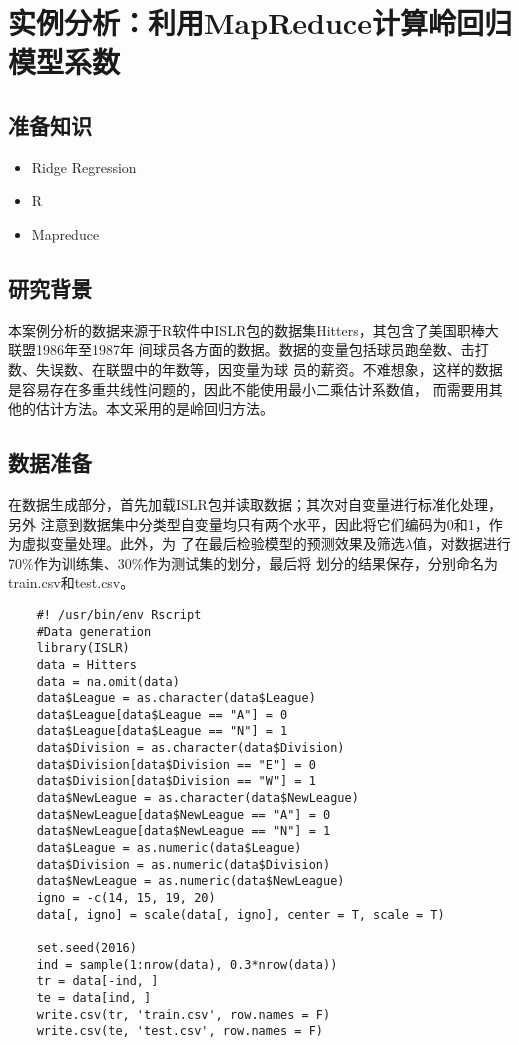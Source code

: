 \section{实例分析：利用MapReduce计算岭回归模型系数}\label{ux5b9eux4f8bux5206ux6790ux5229ux7528mapreduceux8ba1ux7b97ux5cadux56deux5f52ux6a21ux578bux7cfbux6570}

\subsection{准备知识}\label{ux51c6ux5907ux77e5ux8bc6}

\begin{itemize}
\itemsep1pt\parskip0pt
\item
  Ridge Regression
\item
  R
\item
  Mapreduce
\end{itemize}

\subsection{研究背景}\label{ux7814ux7a76ux80ccux666f}

本案例分析的数据来源于R软件中ISLR包的数据集Hitters，其包含了美国职棒大联盟1986年至1987年
间球员各方面的数据。数据的变量包括球员跑垒数、击打数、失误数、在联盟中的年数等，因变量为球
员的薪资。不难想象，这样的数据是容易存在多重共线性问题的，因此不能使用最小二乘估计系数值，
而需要用其他的估计方法。本文采用的是岭回归方法。


\subsection{数据准备}\label{ux6570ux636eux51c6ux5907}

在数据生成部分，首先加载ISLR包并读取数据；其次对自变量进行标准化处理，另外
注意到数据集中分类型自变量均只有两个水平，因此将它们编码为0和1，作为虚拟变量处理。此外，为
了在最后检验模型的预测效果及筛选$\lambda$值，对数据进行70\%作为训练集、30\%作为测试集的划分，最后将
划分的结果保存，分别命名为train.csv和test.csv。

\begin{lstlisting}
	#! /usr/bin/env Rscript
	#Data generation
	library(ISLR)
	data = Hitters
	data = na.omit(data)
	data$League = as.character(data$League)
	data$League[data$League == "A"] = 0
	data$League[data$League == "N"] = 1
	data$Division = as.character(data$Division)
	data$Division[data$Division == "E"] = 0
	data$Division[data$Division == "W"] = 1
	data$NewLeague = as.character(data$NewLeague)
	data$NewLeague[data$NewLeague == "A"] = 0
	data$NewLeague[data$NewLeague == "N"] = 1
	data$League = as.numeric(data$League)
	data$Division = as.numeric(data$Division)
	data$NewLeague = as.numeric(data$NewLeague)
	igno = -c(14, 15, 19, 20)
	data[, igno] = scale(data[, igno], center = T, scale = T)

	set.seed(2016)
	ind = sample(1:nrow(data), 0.3*nrow(data))
	tr = data[-ind, ]
	te = data[ind, ]
	write.csv(tr, 'train.csv', row.names = F)
	write.csv(te, 'test.csv', row.names = F)
\end{lstlisting}

